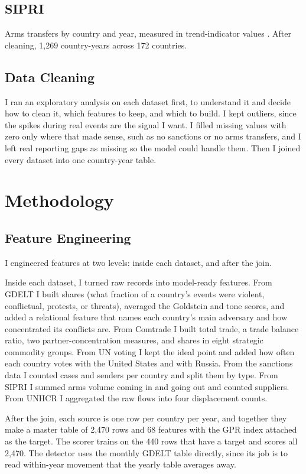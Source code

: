 \documentclass[stu,12pt,floatsintext]{apa7}
\begin{document}
\subsection{SIPRI}
Arms transfers by country and year, measured in trend-indicator values \cite{sipri2024,holtom2012}. After cleaning, 1,269 country-years across 172 countries.

\subsection{Data Cleaning}
I ran an exploratory analysis on each dataset first, to understand it and decide how to clean it, which features to keep, and which to build. I kept outliers, since the spikes during real events are the signal I want. I filled missing values with zero only where that made sense, such as no sanctions or no arms transfers, and I left real reporting gaps as missing so the model could handle them. Then I joined every dataset into one country-year table.

\section{Methodology}
\subsection{Feature Engineering}
I engineered features at two levels: inside each dataset, and after the join.

Inside each dataset, I turned raw records into model-ready features. From GDELT I built shares (what fraction of a country's events were violent, conflictual, protests, or threats), averaged the Goldstein and tone scores, and added a relational feature that names each country's main adversary and how concentrated its conflicts are. From Comtrade I built total trade, a trade balance ratio, two partner-concentration measures, and shares in eight strategic commodity groups. From UN voting I kept the ideal point and added how often each country votes with the United States and with Russia. From the sanctions data I counted cases and senders per country and split them by type. From SIPRI I summed arms volume coming in and going out and counted suppliers. From UNHCR I aggregated the raw flows into four displacement counts.

After the join, each source is one row per country per year, and together they make a master table of 2,470 rows and 68 features with the GPR index attached as the target. The scorer trains on the 440 rows that have a target and scores all 2,470. The detector uses the monthly GDELT table directly, since its job is to read within-year movement that the yearly table averages away.
\end{document}
